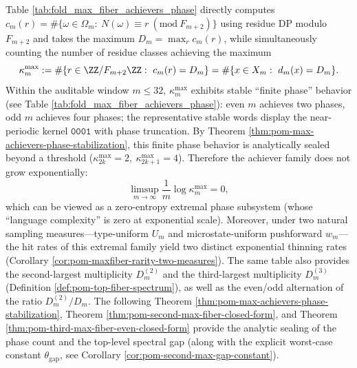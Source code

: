 \begin{remark}\label{rem:pom-max-fiber-achievers-phase}
Table \ref{tab:fold_max_fiber_achievers_phase} directly computes
\(
c_m(r)=\#\{\omega\in\Omega_m:\ N(\omega)\equiv r\ (\mathrm{mod}\ F_{m+2})\}
\)
using residue DP modulo \(F_{m+2}\) and takes the maximum \(D_m=\max_r c_m(r)\), while simultaneously counting the number of residue classes achieving the maximum
\[
\kappa_m^{\mathrm{max}}:=\#\{r\in\ZZ/F_{m+2}\ZZ:\ c_m(r)=D_m\}
=\#\{x\in X_m:\ d_m(x)=D_m\}.
\]
Within the auditable window \(m\le 32\), \(\kappa_m^{\mathrm{max}}\) exhibits stable ``finite phase'' behavior (see Table \ref{tab:fold_max_fiber_achievers_phase}): even \(m\) achieves two phases, odd \(m\) achieves four phases; the representative stable words display the near-periodic kernel \(\texttt{0001}\) with phase truncation.
By Theorem \ref{thm:pom-max-achievers-phase-stabilization}, this finite phase behavior is analytically sealed beyond a threshold (\(\kappa_{2k}^{\mathrm{max}}=2,\ \kappa_{2k+1}^{\mathrm{max}}=4\)).
Therefore the achiever family does not grow exponentially:
\[
\limsup_{m\to\infty}\frac{1}{m}\log \kappa_m^{\mathrm{max}}=0,
\]
which can be viewed as a zero-entropy extremal phase subsystem (whose ``language complexity'' is zero at exponential scale).
Moreover, under two natural sampling measures---type-uniform \(U_m\) and microstate-uniform pushforward \(w_m\)---the hit rates of this extremal family yield two distinct exponential thinning rates (Corollary \ref{cor:pom-maxfiber-rarity-two-measures}).
The same table also provides the second-largest multiplicity \(D_m^{(2)}\) and the third-largest multiplicity \(D_m^{(3)}\) (Definition \ref{def:pom-top-fiber-spectrum}), as well as the even/odd alternation of the ratio \(D_m^{(2)}/D_m\). The following Theorem \ref{thm:pom-max-achievers-phase-stabilization}, Theorem \ref{thm:pom-second-max-fiber-closed-form}, and Theorem \ref{thm:pom-third-max-fiber-even-closed-form} provide the analytic sealing of the phase count and the top-level spectral gap (along with the explicit worst-case constant \(\theta_{\mathrm{gap}}\), see Corollary \ref{cor:pom-second-max-gap-constant}).
\end{remark}

